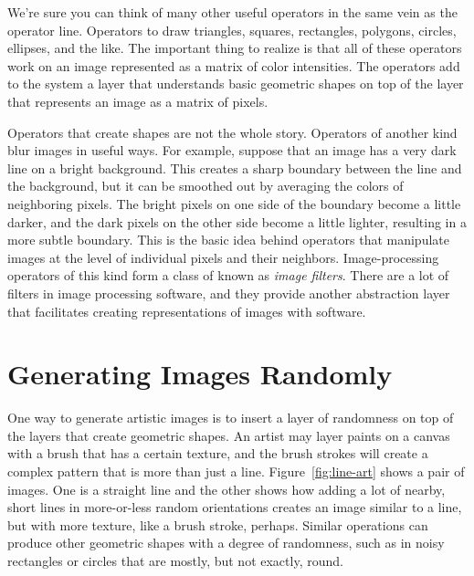 We're sure you can think of many other useful operators in
the same vein as the operator \textsf{line}. Operators to draw
triangles, squares, rectangles, polygons, circles,
ellipses, and the like. The important thing to realize is that all of
these operators work on an image represented as a matrix of
color intensities.
The operators add to the system a layer that understands
basic geometric shapes on top of the layer that represents an image
as a matrix of pixels.

Operators that create shapes are not the whole story.
Operators of another kind blur images in useful ways.
For example, suppose that an image has a
very dark line on a bright background. This creates a
sharp boundary between the line and the background, but it can be
smoothed out by averaging the colors of neighboring pixels. 
The bright pixels on one side of the boundary become a little darker,
and the dark pixels on the other side become a little lighter,
resulting in a more subtle boundary. This is the basic idea behind
operators that manipulate images at the level
of individual pixels and their neighbors. Image-processing operators
of this kind form a class of  known as \emph{image filters}. 
There are a lot of filters in image
processing software, and they provide another abstraction layer 
that facilitates creating representations of images with software.

\section{Generating Images Randomly}

One way to generate artistic images is to insert a layer of
randomness on top of the layers that create geometric shapes.
An artist may layer paints on a canvas
with a brush that has a certain texture, and the brush strokes
will create a complex pattern that is more than just a line.
Figure~\ref{fig:line-art} shows a pair of images.
One is a straight line 
and the other shows how adding a lot of nearby, short lines in
more-or-less random orientations
creates an image similar to a line, but with more texture,
like a brush stroke, perhaps.
Similar operations can produce
other geometric shapes with a degree of randomness, 
such as in noisy rectangles or circles that are 
mostly, but not exactly, round.

